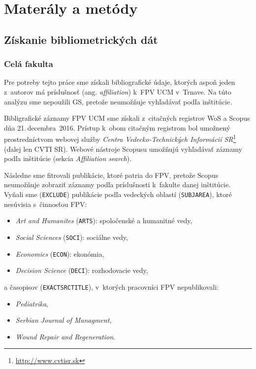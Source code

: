 \chapter{Materály a metódy}

\section{Získanie bibliometrických dát}

\subsection{Celá fakulta}
\label{sec.all.mining}

Pre potreby tejto práce sme získali bibliografické údaje, ktorých aspoň jeden
z~autorov má príslušnosť (ang. \emph{affiliation}) k~FPV UCM v~Trnave. Na túto
analýzu sme nepoužili GS, pretože neumožňuje vyhľadávať podľa inštitúcie.

Bibligrafické záznamy FPV UCM sme získali z~citačných registrov WoS a Scopus dňa
21.\,decembra~2016.  Prístup k~obom citačným registrom bol umožnený
prostredníctvom webovej služby \emph{Centra Vedecko-Technických Informácií
  SR}\footnote{\url{http://www.cvtisr.sk}} (ďalej len CVTI SR).  Webové nástroje
Scopusu umožňujú vyhľadávať záznamy podľa inštitúcie (sekcia \emph{Affiliation
  search}).

Následne sme fitrovali publikácie, ktoré patria do FPV, pretože Scopus
neumožňuje zobraziť záznamy podľa príslušnosti k~fakulte danej inštitúcie.
Vyňali sme (\texttt{EXCLUDE}) publikácie podľa vedeckých oblastí
(\texttt{SUBJAREA}), ktoré nesúvisia s~činnosťou FPV:

\begin{itemize}
\item \emph{Art and Humanites} (\texttt{ARTS}): spoločenské a humanitné vedy,
\item \emph{Social Sciences} (\texttt{SOCI}): sociálne vedy,
\item \emph{Economics} (\texttt{ECON}): ekonómia,
\item \emph{Decision Science} (\texttt{DECI}): rozhodovacie vedy,
\end{itemize}
a časopisov (\texttt{EXACTSRCTITLE}), v~ktorých pracovníci FPV nepublikovali:

\begin{itemize}
\item \emph{Pediatrika},
\item \emph{Serbian Journal of Managment},
\item \emph{Wound Repair and Regeneration}.
\end{itemize}

